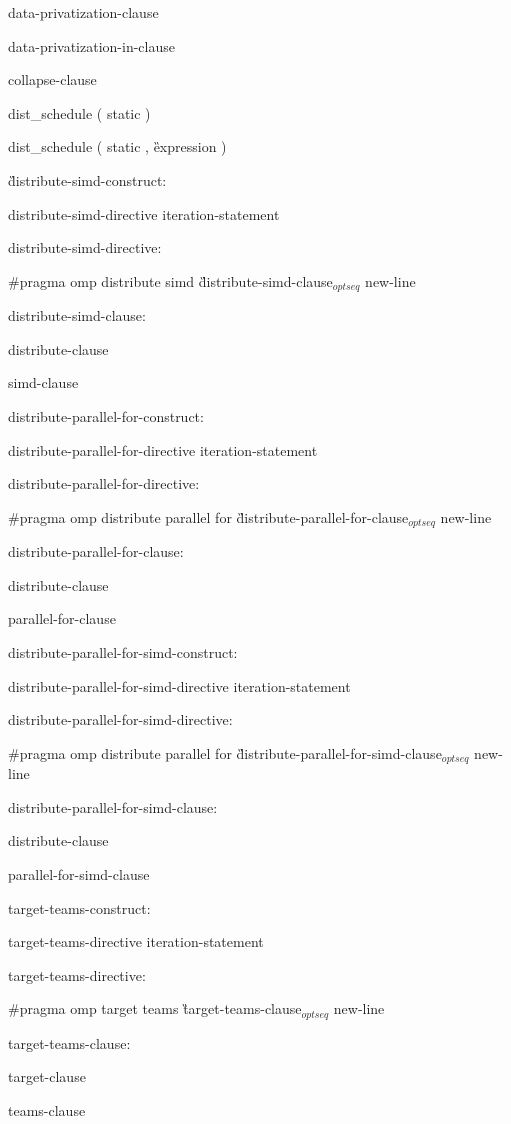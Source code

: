 {\I data-privatization-clause

\I data-privatization-in-clause

\I collapse-clause

\I dist\_schedule ( static )

\I dist\_schedule ( static , \G expression \C )

\G distribute-simd-construct:

\I distribute-simd-directive iteration-statement

distribute-simd-directive:

\C\I \#pragma omp distribute simd \G distribute-simd-clause$_{optseq}$ new-line

distribute-simd-clause:

\I distribute-clause

\I simd-clause

distribute-parallel-for-construct:

\I distribute-parallel-for-directive iteration-statement

distribute-parallel-for-directive:

\C\I \#pragma omp distribute parallel for \G distribute-parallel-for-clause$_{optseq}$ new-line

\I distribute-parallel-for-clause:

\I\I distribute-clause

\I\I parallel-for-clause

\I distribute-parallel-for-simd-construct:

\I\I distribute-parallel-for-simd-directive iteration-statement

\I distribute-parallel-for-simd-directive:

\C\I\I \#pragma omp distribute parallel for \G distribute-parallel-for-simd-clause$_{optseq}$ new-line

\I distribute-parallel-for-simd-clause:

\I\I distribute-clause

\I\I parallel-for-simd-clause

\I target-teams-construct:

\I\I target-teams-directive iteration-statement

\I target-teams-directive:

\C\I\I \#pragma omp target teams \G target-teams-clause$_{optseq}$ new-line

\I target-teams-clause:

\I\I target-clause

\I\I teams-clause

}
